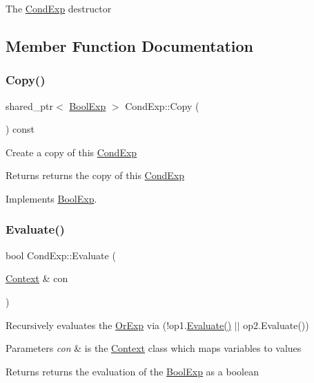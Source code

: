 The \mbox{\hyperlink{classCondExp}{Cond\+Exp}} destructor 

\subsection{Member Function Documentation}
\mbox{\label{classCondExp_a07dc28d880912ea9553c75ebf26431e8}} 
\subsubsection{\texorpdfstring{Copy()}{Copy()}}
{\footnotesize\ttfamily shared\+\_\+ptr$<$ \mbox{\hyperlink{classBoolExp}{Bool\+Exp}} $>$ Cond\+Exp\+::\+Copy (\begin{DoxyParamCaption}{ }\end{DoxyParamCaption}) const\hspace{0.3cm}{\ttfamily [virtual]}}

Create a copy of this \mbox{\hyperlink{classCondExp}{Cond\+Exp}} \begin{DoxyReturn}{Returns}
returns the copy of this \mbox{\hyperlink{classCondExp}{Cond\+Exp}} 
\end{DoxyReturn}


Implements \mbox{\hyperlink{classBoolExp_a846c30d1730cf645a040978a4cf7cdbb}{Bool\+Exp}}.

\mbox{\label{classCondExp_a36c86af1adba98b0ab7d15fa53e4027f}} 
\subsubsection{\texorpdfstring{Evaluate()}{Evaluate()}}
{\footnotesize\ttfamily bool Cond\+Exp\+::\+Evaluate (\begin{DoxyParamCaption}\item[{\mbox{\hyperlink{classContext}{Context}} \&}]{con }\end{DoxyParamCaption})\hspace{0.3cm}{\ttfamily [virtual]}}

Recursively evaluates the \mbox{\hyperlink{classOrExp}{Or\+Exp}} via (!op1.\mbox{\hyperlink{classCondExp_a36c86af1adba98b0ab7d15fa53e4027f}{Evaluate()}} $\vert$$\vert$ op2.\+Evaluate()) 
\begin{DoxyParams}{Parameters}
{\em con} & is the \mbox{\hyperlink{classContext}{Context}} class which maps variables to values \\
\hline
\end{DoxyParams}
\begin{DoxyReturn}{Returns}
returns the evaluation of the \mbox{\hyperlink{classBoolExp}{Bool\+Exp}} as a boolean 
\end{DoxyReturn}


